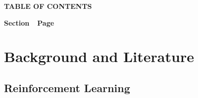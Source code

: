 \documentclass[twoside,letterpaper]{article}
\begin{document}
{\centering{}\bfseries\color{black}
TABLE OF CONTENTS
\par}


\bigskip

{\bfseries\color{black}
Section\ \ Page}

\setcounter{tocdepth}{9}
\renewcommand\contentsname{}
\tableofcontents

\bigskip

\clearpage\clearpage\setcounter{page}{1}\pagestyle{Convertii}
\section[Background and Literature]
{\rmfamily\bfseries\color{black}
Background and Literature}

\subsection[Reinforcement Learning]{\rmfamily\bfseries\color{black}
Reinforcement Learning}
\end{document}
